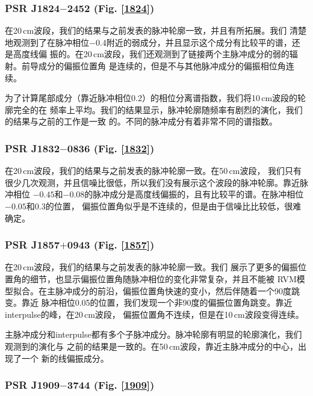 \subsubsection{PSR J1824$-$2452 (Fig. \ref{1824})}

在20\,cm波段，我们的结果与之前发表的脉冲轮廓一致，并且有所拓展\supercite{Yan11a}。我们
清楚地观测到了在脉冲相位$-0.4$附近的弱成分，并且显示这个成分有比较平的谱，还是高度线偏
振的。在20\,cm波段，我们还观测到了链接两个主脉冲成分的弱的辐射。前导成分的偏振位置角
是连续的，但是不与其他脉冲成分的偏振相位角连续。

为了计算尾部成分（靠近脉冲相位$0.2$）的相位分离谱指数，我们将10\,cm波段的轮廓完全的在
频率上平均。我们的结果显示，脉冲轮廓随频率有剧烈的演化，我们的结果与之前的工作是一致
的\supercite{Stairs99}。不同的脉冲成分有着非常不同的谱指数。

\subsubsection{PSR J1832$-$0836 (Fig. \ref{1832})}

在20\,cm波段，我们的结果与之前发表的脉冲轮廓一致\supercite{Burgay13}。在50\,cm波段，
我们只有很少几次观测，并且信噪比很低，所以我们没有展示这个波段的脉冲轮廓。靠近脉冲相位
$-0.45$和$-0.08$的脉冲成分是高度线偏振的，且有比较平的谱。在脉冲相位$-0.05$和0.3的位置，
偏振位置角似乎是不连续的，但是由于信噪比比较低，很难确定。

\subsubsection{PSR J1857$+$0943 (Fig. \ref{1857})}

在20\,cm波段，我们的结果与之前发表的脉冲轮廓一致\supercite{Xilouris98,Yan11a}。我们
展示了更多的偏振位置角的细节，也显示偏振位置角随脉冲相位的变化非常复杂，并且不能被
RVM模型拟合。在主脉冲成分的前沿，偏振位置角快速的变小，然后伴随着一个90度跳变。靠近
脉冲相位0.05的位置，我们发现一个非90度的偏振位置角跳变。靠近interpulse的峰，在20\,cm波段，
偏振位置角不连续，但是在10\,cm波段变得连续。

主脉冲成分和interpulse都有多个子脉冲成分。脉冲轮廓有明显的轮廓演化，我们观测到的演化与
之前的结果是一致的\supercite{Thorsett90}。在50\,cm波段，靠近主脉冲成分的中心，出现了一个
新的线偏振成分。

\subsubsection{PSR J1909$-$3744 (Fig. \ref{1909})}

